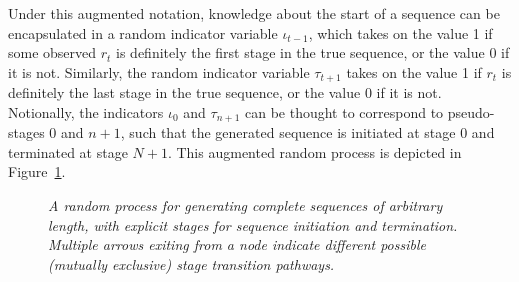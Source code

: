 \documentclass[a4paper]{article}
\begin{document}
Under this augmented notation, knowledge about the start of a sequence can be encapsulated in 
a random indicator variable $\iota_{t-1}$, which takes on the value 1 if some observed $r_{t}$ is definitely the first stage in the
true sequence, or the value 0 if it is not. Similarly, the random indicator variable $\tau_{t+1}$
takes on the value 1 if $r_{t}$ is definitely the last stage in the true sequence, or the value 0 if it is not.
Notionally, the indicators $\iota_0$ and $\tau_{n+1}$ can be thought to correspond to pseudo-stages 0 and $n+1$, such that
the generated sequence is initiated at stage 0 and terminated at stage $N+1$.
This augmented random process is depicted in Figure~\ref{fig:random-process}. 
\begin{figure}[hbt]
\centering
{}
\caption{\em A random process for generating complete sequences of arbitrary length,
with explicit stages for sequence initiation and termination. Multiple arrows exiting from a node indicate
different possible (mutually exclusive) stage transition pathways.}
\label{fig:random-process}
\end{figure}
\end{document}
